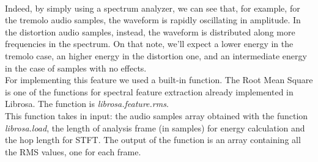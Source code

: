 \documentclass{article}
\begin{document}
\\Indeed, by simply using a spectrum analyzer, we can see that, for example, for the tremolo audio samples, the waveform is rapidly oscillating in amplitude. In the distortion audio samples, instead, the waveform is distributed along more frequencies in the spectrum. On that note, we'll expect a lower energy in the tremolo case, an higher energy in the distortion one, and an intermediate energy in the case of samples with no effects.
\\For implementing this feature we used a built-in function. The Root Mean Square is one of the functions for spectral feature extraction already implemented in Librosa. The function is \emph{librosa.feature.rms}.
\\This function takes in input: the audio samples array obtained with the function \emph{librosa.load}, the length of analysis frame (in samples) for energy calculation and the hop length for STFT. 
The output of the function is an array containing all the RMS values, one for each frame.
\end{document}
